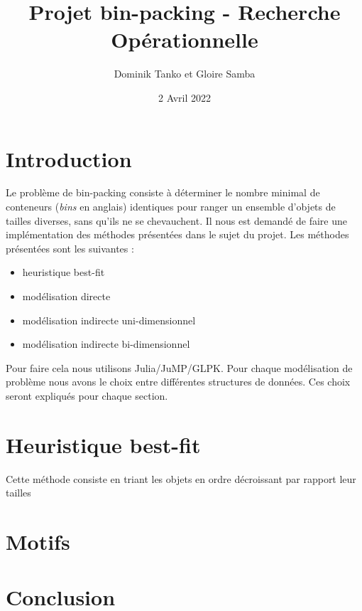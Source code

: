\documentclass{article}
\title{Projet bin-packing - Recherche Opérationnelle}
\author{Dominik Tanko et Gloire Samba}
\date{2 Avril 2022}
\begin{document}
\maketitle

\newpage

\section{Introduction}
    Le problème de bin-packing consiste à déterminer le nombre minimal de conteneurs (\textit{bins} en anglais) identiques pour ranger un ensemble d’objets de tailles diverses, sans qu’ils ne se chevauchent.
    Il nous est demandé de faire une implémentation des méthodes présentées dans le sujet du projet. Les méthodes présentées sont les suivantes : 
    \begin{itemize}
        \item heuristique best-fit
        \item modélisation directe
        \item modélisation indirecte uni-dimensionnel
        \item modélisation indirecte bi-dimensionnel
    \end{itemize}
    Pour faire cela nous utilisons Julia/JuMP/GLPK. Pour chaque modélisation de problème nous avons le choix entre différentes structures de données. Ces choix seront expliqués pour chaque section.

\section{Heuristique best-fit}
    Cette méthode consiste en triant les objets en ordre décroissant par rapport leur tailles

\section{Motifs}


\section{Conclusion}
\end{document}

